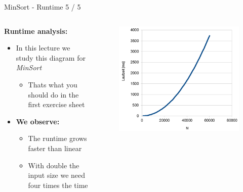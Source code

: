 
\begin{frame}{MinSort - Runtime 5 / 5}
  \begin{columns}%
    \begin{column}{0.5\textwidth}%
      \textbf{Runtime analysis:}
      \begin{itemize}
        \item
          In this lecture we study this diagram for \textit{MinSort}
          \begin{itemize}
            \item
              Thats what you should do in the first exercise sheet
          \end{itemize}
        \item
          \textbf{We observe:}\\
          \begin{itemize}
            \item
              The runtime {\color{Mittel-Blau}grows faster than linear}
            \item
              With double the input size we need four times the time
          \end{itemize}
      \end{itemize}
    \end{column}%
    \begin{column}{0.5\textwidth}%
      \begin{center}%
        \begin{figure}%
          \includegraphics[width=\textwidth]{Lecture/Images/RuntimeSquared.png}%

\end{figure}
\end{center}
\end{column}
\end{columns}
\end{frame}
